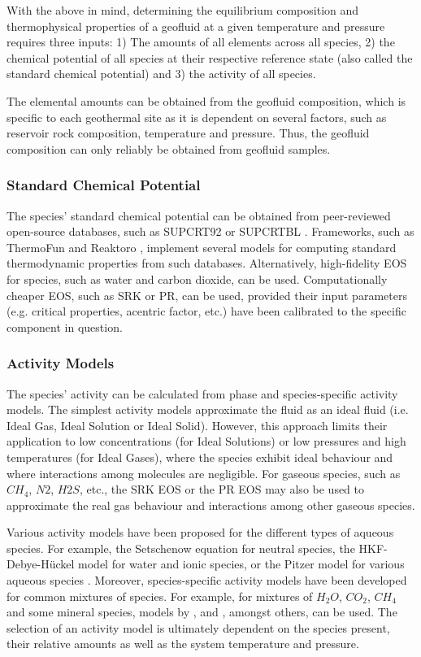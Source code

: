     With the above in mind, determining the equilibrium composition and thermophysical properties of a geofluid at a given temperature and pressure requires three inputs: 1) The amounts of all elements across all species, 2) the chemical potential of all species at their respective reference state (also called the standard chemical potential) and 3) the activity of all species.
    
    The elemental amounts can be obtained from the geofluid composition, which is specific to each geothermal site as it is dependent on several factors, such as reservoir rock composition, temperature and pressure. Thus, the geofluid composition can only reliably be obtained from geofluid samples.

    \subsubsection{Standard Chemical Potential}
    The species’ standard chemical potential can be obtained from peer-reviewed open-source databases, such as SUPCRT92 \cite{Johnson1992} or SUPCRTBL \cite{Zimmer2016}. Frameworks, such as ThermoFun \cite{Miron2021} and Reaktoro \cite{Leal2015}, implement several models for computing standard thermodynamic properties from such databases. Alternatively, high-fidelity \ac{EOS} for species, such as water and carbon dioxide, can be used. Computationally cheaper \ac{EOS}, such as \ac{SRK} or \ac{PR}, can be used, provided their input parameters (e.g. critical properties, acentric factor, etc.) have been calibrated to the specific component in question.

    \subsubsection{Activity Models}
    The species’ activity can be calculated from phase and species-specific activity models. The simplest activity models approximate the fluid as an ideal fluid (i.e. Ideal Gas, Ideal Solution or Ideal Solid). However, this approach limits their application to low concentrations (for Ideal Solutions) or low pressures and high temperatures (for Ideal Gases), where the species exhibit ideal behaviour and where interactions among molecules are negligible. For gaseous species, such as \(CH_4\), \(N2\), \(H2S\), etc., the \ac{SRK} \ac{EOS} or the \ac{PR} \ac{EOS} may also be used to approximate the real gas behaviour and interactions among other gaseous species.

    Various activity models have been proposed for the different types of aqueous species. For example, the Setschenow equation \cite{Setschenow1889} for neutral species, the HKF-Debye-Hückel model \cite{Helgeson1981} for water and ionic species, or the Pitzer model for various aqueous species \cite{Pitzer1973}. Moreover, species-specific activity models have been developed for common mixtures of species. For example, for mixtures of \(H_2O\), \(CO_2\), \(CH_4\) and some mineral species, models by \citeauthor{Duan2003}, \citeauthor{Spycher2003} and \citeauthor{Spycher2009}, amongst others, can be used. The selection of an activity model is ultimately dependent on the species present, their relative amounts as well as the system temperature and pressure.

